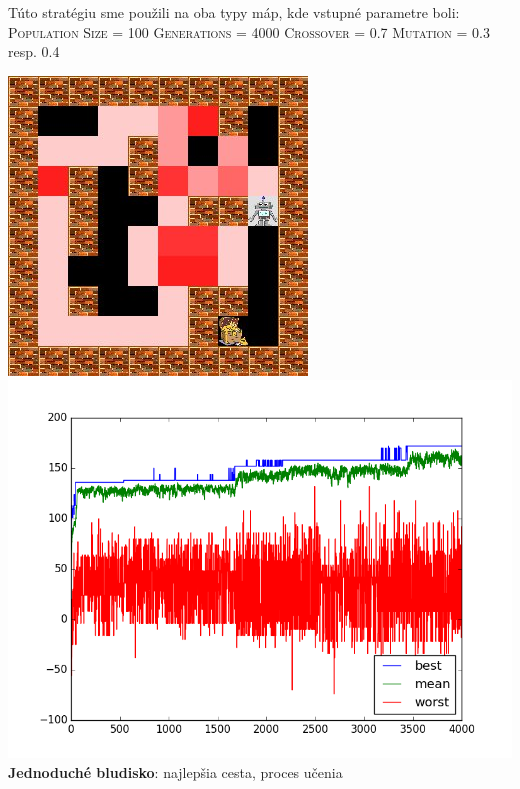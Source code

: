 \documentclass[10pt]{paper}
\begin{document}
\noindent Túto stratégiu sme použili na oba typy máp, kde vstupné parametre boli:\\

\textsc{Population Size} = 100 \textsc{Generations} = 4000 \textsc{Crossover} = 0.7 \textsc{Mutation} = 0.3 resp. 0.4 

 
\begin{center}
  \includegraphics[scale=0.5]{strategy1_simple.jpg} 
  \includegraphics[scale=0.38]{strategy1_simple_graph.png} \\
   \textbf{Jednoduché bludisko}: najlepšia cesta, proces učenia
     \end{center}
     
\end{document}
